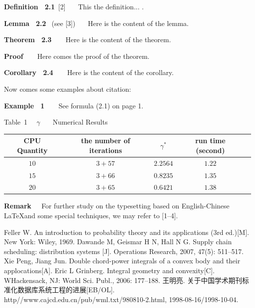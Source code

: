 \documentclass[A4paper,11pt,onecolumn,twoside]{ctexart}
\begin{document}
{\bf Definition~ 2.1}~[2]~~~   This the definition... .



{\bf Lemma~ 2.2}~ (see [3])~~~  Here is the content of the lemma.




{\bf Theorem~ 2.3~~~}  Here is the content of the theorem.




{\bf Proof~~~}   Here comes the proof of the theorem.



{\bf Corollary~  2.4~~~}  Here is the content of the corollary.




Now comes some examples about citation:


{\bf Example~  1~~~}  See formula (2.1) on page 1.


\begin{center}
 {\small Table~1~~   $\gamma$~~~ Numerical Results}
 \vskip 2mm
\begin{tabular}{ccccc}
  \hline
  CPU Quantity & the number of iterations &   $\gamma^*$ & run time (second) \\
 \hline
   $10$ &  $3+57$ &         $ 2.2564$ & $1.22$\\
   $15$ &   $3+66$ &          $0.8235$ &  $1.35$\\
    $20$ &    $3+65$ &        $ 0.6421$ & $1.38$\\
  \hline
  \end{tabular}
\end{center}


\vskip 4mm  \vskip 3mm
\setcounter{section}{3}\setcounter{equation}{0}

{\bf Remark~~}  For further study on the typesetting based on
English-Chinese \LaTeX and some special techniques, we may refer
to [1--4].

\vspace{4mm}
\begin{thebibliography}{99}
\addtolength{\itemsep}{-0.8 em} %
    Feller W.  An introduction to probability theory and its applications (3rd ed.)[M]. New York: Wiley, 1969.
     Dawande M, Geismar H  N, Hall N G. Supply chain
scheduling: distribution systems [J]. Operations Research, 2007,
47(5): 511--517.
    Xie Peng, Jiang Jun. Double chord-power integrals
  of a convex body and their applocations[A]. Eric L Grinberg.
  Integral geometry and convexity[C]. WHackensack, NJ: World Sci. Publ.,
   2006:  177--188.
    王明亮. 关于中国学术期刊标准化数据库系统工程的进展[EB/OL].
  http//www.cajcd.edu.cn/pub/wml.txt/980810-2.html, 1998-08-16/1998-10-04.
  \end{thebibliography}
\end{document}
